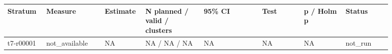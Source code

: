 \begingroup
\small
\setlength{\tabcolsep}{2pt}
\begin{longtable}{@{}p{0.09\linewidth}p{0.14\linewidth}p{0.08\linewidth}p{0.14\linewidth}p{0.14\linewidth}p{0.1\linewidth}p{0.1\linewidth}p{0.11\linewidth}@{}}
\hline
Stratum & Measure & Estimate & N planned / valid / clusters & 95\% CI & Test & p / Holm p & Status \\
\hline
t7-r00001 & not\_\allowbreak{}available & NA & NA / NA / NA & NA & NA & NA & not\_\allowbreak{}run \\
\hline
\end{longtable}
\endgroup
